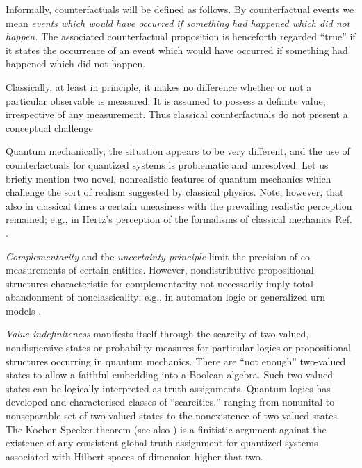 \documentclass{aipproc}
\begin{document}
Informally, counterfactuals will be defined as follows.
By counterfactual events we mean
{\em events which would have occurred if something had happened which did not happen.}
The associated counterfactual proposition is henceforth regarded ``true''
if it states the occurrence of an event which would have occurred if something had happened which did not happen.

Classically, at least in principle,
it makes no difference whether or not a particular observable is measured.
It is assumed to possess a definite value, irrespective of any measurement.
Thus classical counterfactuals do not present a conceptual challenge.

Quantum mechanically, the situation appears to be very different,
and the use of counterfactuals for quantized systems is problematic and unresolved.
Let us briefly mention two novel, nonrealistic features of quantum mechanics which
challenge the sort of realism suggested by classical physics.
Note, however, that also in classical times a certain uneasiness with the prevailing realistic perception
remained; e.g., in Hertz's perception of the formalisms of classical mechanics Ref. \cite{hertz-94}.

{\em Complementarity} and the {\em uncertainty principle} limit the precision of co-measurements
of certain entities.
However, nondistributive propositional structures characteristic for complementarity
not necessarily imply total abandonment of nonclassicality; e.g.,
in automaton logic \cite[Chapter 10]{svozil-ql} or generalized urn models
\cite{wright,svozil-2001-eua}.

{\em Value indefiniteness} manifests itself through the scarcity of two-valued, nondispersive
states or probability measures for particular logics or propositional structures occurring in quantum mechanics.
There are ``not enough'' two-valued states to allow a faithful embedding into a Boolean algebra.
Such two-valued states can be logically interpreted as  truth assignments.
Quantum logics \cite{pulmannova-91,svozil-ql} has developed and characterised classes of ``scarcities,''
ranging from nonunital to  nonseparable set of two-valued states to the nonexistence
of two-valued states.
The Kochen-Specker theorem \cite{kochen1}
(see also
\cite{specker-60,kamber64,kamber65,ZirlSchl-65,bell-66,Alda,Alda2,peres,mermin-93,svozil-tkadlec,tkadlec-00})
is a finitistic argument against the existence of any
consistent global truth assignment for quantized systems
associated with Hilbert spaces of dimension higher that two.
\end{document}
